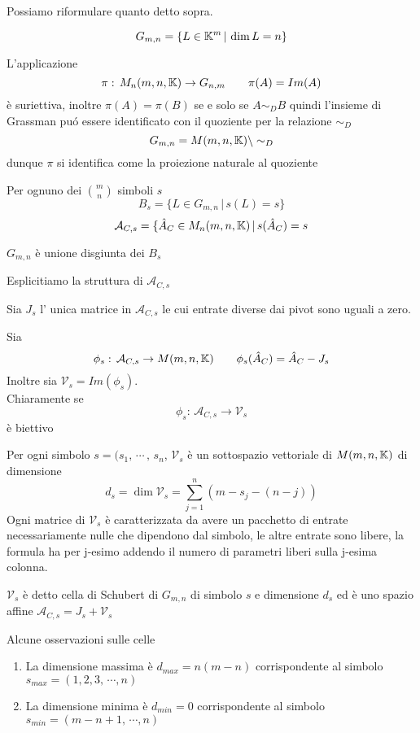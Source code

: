 \spazio
Possiamo riformulare quanto detto sopra.
\begin{defn}
$$G_{m,n} =\{ L \in \mathbb{K} ^m \, \vert \, \dim L=n \}$$
\end{defn}

L'applicazione
$$ \pi :\, M_n(m,n,\mathbb{K}) \to G_{n,m}  \qquad \pi(A)= Im(A)$$
\`e suriettiva, inoltre $ \pi(A)=\pi(B) $ se e solo se $ A \sim_D B $ quindi l'insieme di Grassman pu\'o essere identificato con il quoziente per la relazione $\sim_D$ 
$$ G_{m,n} =M(m,n,\mathbb{K}) \backslash \sim_D$$
dunque $\pi$ si identifica come la proiezione naturale al quoziente 
\spazio

\begin{defn} Per ognuno dei $ { m \choose n } $ simboli $s$
$$ B_s=\{ L \in G_{m,n} \, \vert \, s(L)=s \} $$
$$\mathcal{A}_{C,s}=\{ \hat{A}_C \in  M_n(m,n,\mathbb{K}) \, \vert \, s(\hat{A}_C)=s $$
\end{defn}
\begin{oss} $G_{m,n} $ \`e unione disgiunta dei $B_s$ 
\end{oss}

Esplicitiamo la struttura di $\mathcal{A}_{C,s}$ 
\begin{defn} Sia $J_s$ l' unica matrice in $\mathcal{A}_{C,s}$ le cui entrate diverse dai pivot sono uguali a zero.
\end{defn}

Sia 
$$ \phi _s : \, \mathcal{A}_{C,s} \to M(m,n,\mathbb{K}) \qquad \phi_s (\hat{A}_C)=\hat{A}_C -J_s$$ 
Inoltre sia $\mathcal{V}_s=Im(\phi_s)$.\\
Chiaramente se
$$ \phi _s : \, \mathcal{A}_{C,s} \to \mathcal{V}_s$$
\`e biettivo 

\newpage
\begin{prop} Per ogni simbolo $s=(s_1,\, \cdots \, , \, s_n $, $\mathcal{V}_s$ \`e un sottospazio vettoriale di $M(m,n,\mathbb{K}) $ di dimensione
$$ d_s=\dim \mathcal{V}_s= \sum_{j=1}^n ( m-s_j-(n-j))$$
\proof Ogni matrice di $\mathcal{V}_s$ \`e caratterizzata da avere un pacchetto di entrate necessariamente nulle che dipendono dal simbolo, le altre entrate sono libere, la formula ha per j-esimo addendo il numero di parametri liberi sulla j-esima colonna.
\endproof
\end{prop}
$\mathcal{V}_s$ \`e detto cella di Schubert di $G_{m,n}$ di simbolo $s$ e dimensione $d_s$  ed \`e uno spazio affine $  \mathcal{A}_{C,s} = J_s+  \mathcal{V}_s$
\begin{oss} Alcune osservazioni sulle celle
\begin{enumerate}
\item La dimensione massima \`e $d_{max}=n(m-n) $ corrispondente al simbolo $s_{max}=(1,2,3,\, \cdots, n )$
\item La dimensione minima \`e $d_{min}=0$ corrispondente al simbolo $s_{min}=(m-n+1, \, \cdots, n )$
\end{enumerate}
\end{oss}
\spazio 
\spazio
